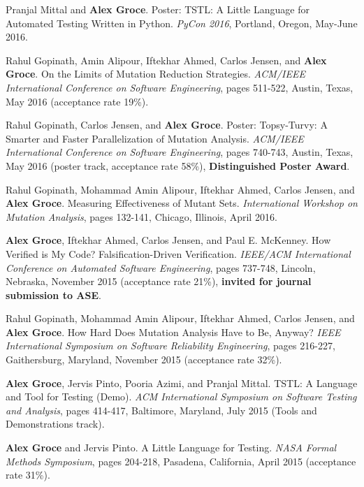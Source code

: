 \documentclass[ComputerScience]{vita}
\begin{document}
\begin{vita}
\begin{Refereed Conference and Workshop Publications}
\item Pranjal Mittal and {\bf Alex Groce}.
\newblock Poster: TSTL: A Little Language for Automated Testing Written in Python.
\newblock \emph{PyCon 2016}, Portland, Oregon, May-June 2016.

\item Rahul Gopinath, Amin Alipour, Iftekhar Ahmed, Carlos Jensen, and {\bf Alex Groce}.
\newblock On the Limits of Mutation Reduction Strategies.
\newblock \emph{ACM/IEEE International Conference on Software Engineering}, pages 511-522, Austin, Texas, May 2016 (acceptance rate 19\%).

\item Rahul Gopinath, Carlos Jensen, and {\bf Alex Groce}.
\newblock Poster: Topsy-Turvy: A Smarter and Faster Parallelization of Mutation Analysis.
\newblock \emph{ACM/IEEE International Conference on Software Engineering}, pages 740-743, Austin, Texas, May 2016 (poster track, acceptance rate 58\%), {\bf Distinguished Poster Award}.

\item Rahul Gopinath, Mohammad Amin Alipour, Iftekhar Ahmed, Carlos Jensen, and {\bf Alex Groce}.
\newblock Measuring Effectiveness of Mutant Sets.
\newblock \emph{International Workshop on Mutation Analysis}, pages 132-141, Chicago, Illinois, April 2016.

\item {\bf Alex Groce}, Iftekhar Ahmed, Carlos Jensen, and Paul E. McKenney.
\newblock How Verified is My Code? Falsification-Driven Verification.
\newblock \emph{IEEE/ACM International Conference on Automated Software Engineering}, pages 737-748, Lincoln, Nebraska, November 2015 (acceptance rate 21\%), {\bf invited for journal submission to ASE}.

\item Rahul Gopinath, Mohammad Amin Alipour, Iftekhar Ahmed, Carlos Jensen, and {\bf Alex Groce}.
\newblock How Hard Does Mutation Analysis Have to Be, Anyway?
\newblock \emph{IEEE International Symposium on Software Reliability Engineering}, pages 216-227, Gaithersburg, Maryland, November 2015 (acceptance rate 32\%).


\item {\bf Alex Groce}, Jervis Pinto, Pooria Azimi, and Pranjal Mittal.
\newblock TSTL: A Language and Tool for Testing (Demo).
\newblock \emph{ACM International Symposium on Software Testing and Analysis}, pages 414-417, Baltimore, Maryland, July 2015 (Tools and Demonstrations track). 

\item {\bf Alex Groce} and Jervis Pinto.
\newblock A Little Language for Testing.
\newblock \emph{NASA Formal Methods Symposium}, pages 204-218, Pasadena, California, April 2015 (acceptance rate 31\%).


\end{Refereed Conference and Workshop Publications}
\end{vita}
\end{document}
